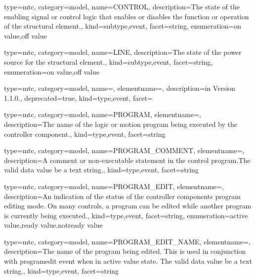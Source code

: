 {
  type=mtc,
  category=model,
  name={CONTROL},
  description={The state of the enabling signal or control logic that enables or disables the function or operation of the \gls{structural element}.},
  kind={subtype,event},
  facet={\gls{string}},
  enumeration={\gls{on value},\gls{off value}}
}


{
  type=mtc,
  category=model,
  name={LINE},
  description={The state of the power source for the \gls{structural element}.},
  kind={subtype,event},
  facet={\gls{string}},
  enumeration={\gls{on value},\gls{off value}}
}


{
  type=mtc,
  category=model,
  name=,
  elementname=,
  description={\DEPRECATED in Version 1.1.0.},
  deprecated={true},
  kind={type,event},
  facet={}
}


{
  type=mtc,
  category=model,
  name={PROGRAM},
  elementname=,
  description={The name of the logic or motion program being executed by the \gls{controller} component.},
  kind={type,event},
  facet={\gls{string}}
}


{
  type=mtc,
  category=model,
  name={PROGRAM\_COMMENT},
  elementname=,
  description={A comment or non-executable statement in the control program.\newline The \gls{valid data value} \must be a text string.},
  kind={type,event},
  facet={\gls{string}}
}


{
  type=mtc,
  category=model,
  name={PROGRAM\_EDIT},
  elementname=,
  description={An indication of the status of the \gls{controller} components program editing mode. \newline On many controls, a program can be edited while another program is currently being executed.},
  kind={type,event},
  facet={\gls{string}},
  enumeration={\gls{active value},\gls{ready value},\gls{notready value}}
}


{
  type=mtc,
  category=model,
  name={PROGRAM\_EDIT\_NAME},
  elementname=,
  description={The name of the program being edited. \newline This is used in conjunction with \gls{programedit event} when in \gls{active value} state. \newline The \gls{valid data value} \must be a text string.},
  kind={type,event},
  facet={\gls{string}}
}


